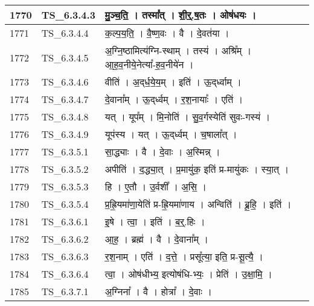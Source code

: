 \documentclass[17pt]{extarticle}
\begin{document}
\begin{longtable}{||p{0.4in}||p{0.9in}||p{4.0in}||p{0.9in}||}
        \hline
            1770 & TS\_6.3.4.3 & मु॒ञ्च॒ति॒   ।   तस्मा᳚त्   ।   शी॒र्॒.ष॒तः   ।   ओष॑धयः   ।    &      \\
        \hline
            1771 & TS\_6.3.4.4 & क॒ल्प॒य॒ति॒   ।   वै॒ष्ण॒वः   ।   वै   ।   दे॒वत॑या   ।    &      \\
        \hline
            1772 & TS\_6.3.4.5 & अ॒ग्नि॒ष्ठामित्य॑ग्नि{-}स्थाम्   ।   तस्य॑   ।   अश्रि᳚म्   ।   आ॒ह॒व॒नीये॒नेत्या᳚{-}ह॒व॒नीये॑न   ।    &      \\
        \hline
            1773 & TS\_6.3.4.6 & वीति॑   ।   अ॒द्‌र्ध॒ये॒य॒म्   ।   इति॑   ।   ऊ॒द्‌र्ध्वाम्   ।    &      \\
        \hline
            1774 & TS\_6.3.4.7 & दे॒वाना᳚म्   ।   ऊ॒द्‌र्ध्वम्   ।   र॒श॒नायाः᳚   ।   एति॑   ।    &      \\
        \hline
            1775 & TS\_6.3.4.8 & यत्   ।   यूप᳚म्   ।   मि॒नोति॑   ।   सु॒व॒र्गस्येति॑ सुवः{-}गस्य॑   ।    &      \\
        \hline
            1776 & TS\_6.3.4.9 & यूप॑स्य   ।   यत्   ।   ऊ॒द्‌र्ध्वम्   ।   च॒षाला᳚त्   ।    &      \\
        \hline
            1777 & TS\_6.3.5.1 & सा॒द्ध्याः   ।   वै   ।   दे॒वाः   ।   अ॒स्मिन्न्   ।    &      \\
        \hline
            1778 & TS\_6.3.5.2 & अपीति॑   ।   द॒द्ध्या॒त्   ।   प्र॒मायु॑क॒ इति॑ प्र{-}मायु॑कः   ।   स्या॒त्   ।    &      \\
        \hline
            1779 & TS\_6.3.5.3 & हि   ।   ए॒तौ   ।   उ॒र्वशी᳚   ।   अ॒सि॒   ।    &      \\
        \hline
            1780 & TS\_6.3.5.4 & प्र॒ह्रि॒यमा॑णा॒येति॑ प्र{-}ह्रि॒यमा॑णाय   ।   अन्विति॑   ।   ब्रू॒हि॒   ।   इति॑   ।    &      \\
        \hline
            1781 & TS\_6.3.6.1 & इ॒षे   ।   त्वा॒   ।   इति॑   ।   ब॒र्॒.हिः   ।    &      \\
        \hline
            1782 & TS\_6.3.6.2 & आ॒ह॒   ।   ब्रह्म॑   ।   वै   ।   दे॒वाना᳚म्   ।    &      \\
        \hline
            1783 & TS\_6.3.6.3 & र॒श॒नाम्   ।   एति॑   ।   द॒त्ते॒   ।   प्रसू᳚त्या॒ इति॒ प्र{-}सू॒त्यै॒   ।    &      \\
        \hline
            1784 & TS\_6.3.6.4 & त्वा॒   ।   ओष॑धीभ्य॒ इत्योष॑धि{-}भ्यः॒   ।   प्रेति॑   ।   उ॒क्षा॒मि॒   ।    &      \\
        \hline
            1785 & TS\_6.3.7.1 & अ॒ग्निना᳚   ।   वै   ।   होत्रा᳚   ।   दे॒वाः   ।    &      \\

\end{longtable}
\end{document}
